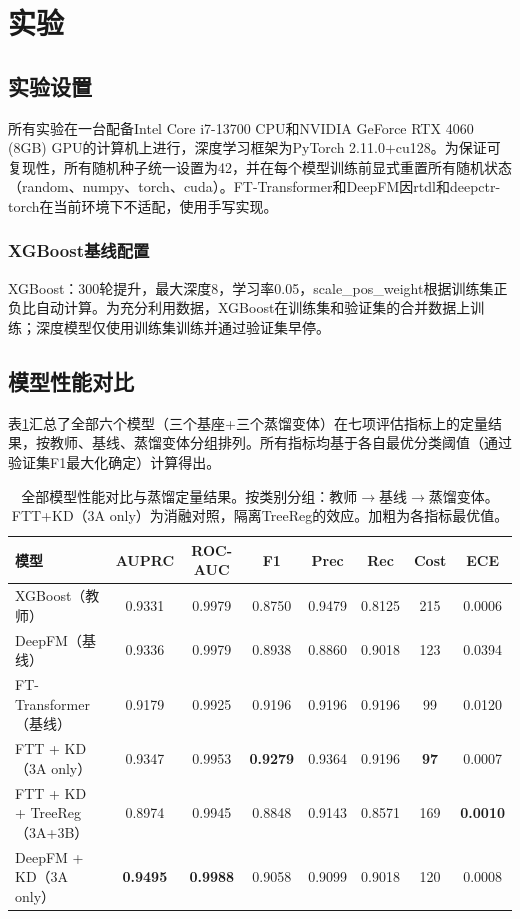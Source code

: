 
\section{实验}
\label{sec:experiments}

\subsection{实验设置}

所有实验在一台配备Intel Core i7-13700 CPU和NVIDIA GeForce RTX 4060 (8GB) GPU的计算机上进行，深度学习框架为PyTorch 2.11.0+cu128。为保证可复现性，所有随机种子统一设置为42，并在每个模型训练前显式重置所有随机状态（random、numpy、torch、cuda）。FT-Transformer和DeepFM因rtdl和deepctr-torch在当前环境下不适配，使用手写实现。

\subsubsection{XGBoost基线配置}

XGBoost：300轮提升，最大深度8，学习率0.05，scale\_pos\_weight根据训练集正负比自动计算。为充分利用数据，XGBoost在训练集和验证集的合并数据上训练；深度模型仅使用训练集训练并通过验证集早停。

\subsection{模型性能对比}

表\ref{tab:model_comparison}汇总了全部六个模型（三个基座+三个蒸馏变体）在七项评估指标上的定量结果，按教师、基线、蒸馏变体分组排列。所有指标均基于各自最优分类阈值（通过验证集F1最大化确定）计算得出。

\begin{table}[htbp]
\centering
\small
\setlength{\tabcolsep}{4pt}
\caption{全部模型性能对比与蒸馏定量结果。按类别分组：教师$\to$基线$\to$蒸馏变体。FTT+KD（3A only）为消融对照，隔离TreeReg的效应。加粗为各指标最优值。}
\label{tab:model_comparison}
\begin{tabular}{lccccccc}
\toprule
\textbf{模型} & \textbf{AUPRC} & \textbf{ROC-AUC} & \textbf{F1} & \textbf{Prec} & \textbf{Rec} & \textbf{Cost} & \textbf{ECE} \\
\midrule
XGBoost（教师）   & 0.9331 & 0.9979 & 0.8750 & 0.9479 & 0.8125 & 215 & 0.0006 \\
DeepFM（基线）    & 0.9336 & 0.9979 & 0.8938 & 0.8860 & 0.9018 & 123 & 0.0394 \\
FT-Transformer（基线） & 0.9179 & 0.9925 & 0.9196 & 0.9196 & 0.9196 & 99 & 0.0120 \\
\addlinespace
FTT + KD（3A only）& 0.9347 & 0.9953 & \textbf{0.9279} & 0.9364 & 0.9196 & \textbf{97} & 0.0007 \\
FTT + KD + TreeReg（3A+3B）& 0.8974 & 0.9945 & 0.8848 & 0.9143 & 0.8571 & 169 & \textbf{0.0010} \\
DeepFM + KD（3A only）& \textbf{0.9495} & \textbf{0.9988} & 0.9058 & 0.9099 & 0.9018 & 120 & 0.0008 \\
\bottomrule
\end{tabular}
\end{table}


